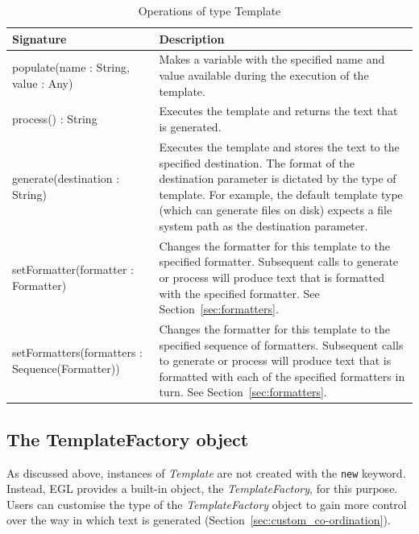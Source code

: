 \begin{longtabu} {|p{5.5cm}|X|}
			
			\caption{Operations of type Template}
			\label{tab:TemplateOperations}\\
			
			\hline
							
			\textbf{Signature} & \textbf{Description} \\\hline
			
			populate(name : String, value : Any) & Makes a variable with the specified name and value available during the execution of the template. \\\hline
			
			process() : String & Executes the template and returns the text that is generated.  \\\hline
			
			generate(destination : String) & Executes the template and stores the text to the specified destination. The format of the destination parameter is dictated by the type of template. For example, the default template type (which can generate files on disk) expects a file system path as the destination parameter. \\\hline
			
			setFormatter(formatter : Formatter) & Changes the formatter for this template to the specified formatter. Subsequent calls to generate or process will produce text that is formatted with the specified formatter. See Section~\ref{sec:formatters}. \\\hline
			
			setFormatters(formatters : Sequence(Formatter)) & Changes the formatter for this template to the specified sequence of formatters. Subsequent calls to generate or process will produce text that is formatted with each of the specified formatters in turn. See Section~\ref{sec:formatters}. \\\hline
\end{longtabu}


\subsection{The TemplateFactory object}
As discussed above, instances of \emph{Template} are not created with the \texttt{new} keyword. Instead, EGL provides a built-in object, the \emph{TemplateFactory}, for this purpose. Users can customise the type of the \emph{TemplateFactory} object to gain more control over the way in which text is generated (Section~\ref{sec:custom_co-ordination}).

